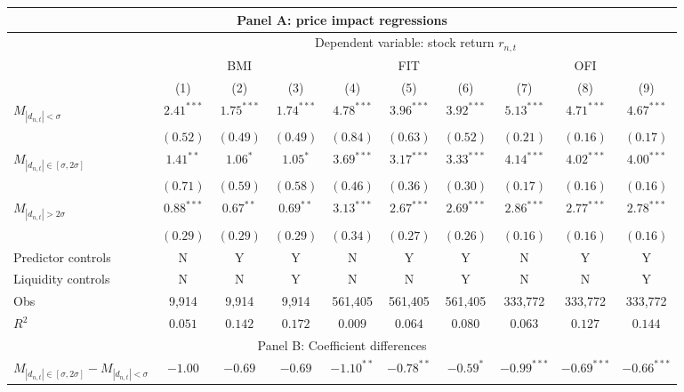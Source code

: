 \begin{tabular}{lccccccccc}
  \hline \multicolumn{10}{c}{Panel A: price impact regressions} \\
 \hline 
                                    & \multicolumn{9}{c}{Dependent variable: stock return $r_{n,t}$} \\

                                    \cmidrule(l){2-10} & \multicolumn{3}{c}{BMI} & \multicolumn{3}{c}{FIT} & \multicolumn{3}{c}{OFI} \\
 \cmidrule(l){2-4} \cmidrule(l){5-7} \cmidrule(l){8-10} 
  & (1) & (2) & (3) & (4) & (5) & (6) & (7) & (8) & (9) \\ 
  $M_{|d_{n,t}| < \sigma}$ & $2.41^{***}$ & $1.75^{***}$ & $1.74^{***}$ & $4.78^{***}$ & $3.96^{***}$ & $3.92^{***}$ & $5.13^{***}$ & $4.71^{***}$ & $4.67^{***}$ \\ 
   & $(0.52)$ & $(0.49)$ & $(0.49)$ & $(0.84)$ & $(0.63)$ & $(0.52)$ & $(0.21)$ & $(0.16)$ & $(0.17)$ \\ 
  $M_{|d_{n,t}| \in [\sigma, 2\sigma]}$ & $1.41^{**}$ & $1.06^{*}$ & $1.05^{*}$ & $3.69^{***}$ & $3.17^{***}$ & $3.33^{***}$ & $4.14^{***}$ & $4.02^{***}$ & $4.00^{***}$ \\ 
   & $(0.71)$ & $(0.59)$ & $(0.58)$ & $(0.46)$ & $(0.36)$ & $(0.30)$ & $(0.17)$ & $(0.16)$ & $(0.16)$ \\ 
  $M_{|d_{n,t}| > 2 \sigma}$ & $0.88^{***}$ & $0.67^{**}$ & $0.69^{**}$ & $3.13^{***}$ & $2.67^{***}$ & $2.69^{***}$ & $2.86^{***}$ & $2.77^{***}$ & $2.78^{***}$ \\ 
   \vspace{5pt} & $(0.29)$ & $(0.29)$ & $(0.29)$ & $(0.34)$ & $(0.27)$ & $(0.26)$ & $(0.16)$ & $(0.16)$ & $(0.16)$ \\ 
  Predictor controls & N & Y & Y & N & Y & Y & N & Y & Y \\ 
   \vspace{5pt}Liquidity controls & N & N & Y & N & N & Y & N & N & Y \\ 
  Obs & 9,914 & 9,914 & 9,914 & 561,405 & 561,405 & 561,405 & 333,772 & 333,772 & 333,772 \\ 
  $R^2$ & $0.051$ & $0.142$ & $0.172$ & $0.009$ & $0.064$ & $0.080$ & $0.063$ & $0.127$ & $0.144$ \\ 
   \hline \multicolumn{10}{c}{Panel B: Coefficient differences} \\
 \hline$M_{|d_{n,t}| \in [\sigma, 2\sigma]} - M_{|d_{n,t}| < \sigma}$ & $-1.00$ & $-0.69$ & $-0.69$ & $-1.10^{**}$ & $-0.78^{**}$ & $-0.59^{*}$ & $-0.99^{***}$ & $-0.69^{***}$ & $-0.66^{***}$ \\ 

\end{tabular}
